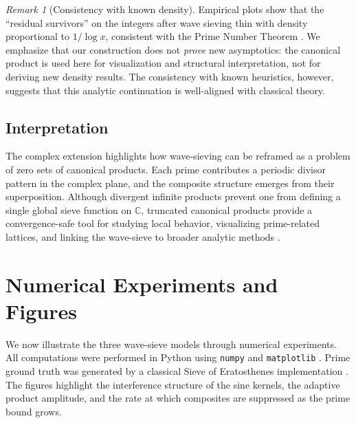 \documentclass[12pt]{article}
\theoremstyle{definition}
\theoremstyle{remark}
\newtheorem{remark}{Remark}
\newcommand{\C}{\mathbb{C}}
\begin{document}
\begin{remark}[Consistency with known density]
Empirical plots show that the ``residual survivors'' on the integers after wave sieving thin 
with density proportional to \(1/\log x\), consistent with the Prime Number Theorem 
\citep{hardy2008introduction,tenenbaum2015analytic}. 
We emphasize that our construction does not \emph{prove} new asymptotics: 
the canonical product is used here for visualization and structural interpretation, 
not for deriving new density results. 
The consistency with known heuristics, however, suggests that this analytic continuation 
is well-aligned with classical theory.
\end{remark}

\subsection{Interpretation}

The complex extension highlights how wave-sieving can be reframed as a problem of zero sets of canonical products. 
Each prime contributes a periodic divisor pattern in the complex plane, 
and the composite structure emerges from their superposition. 
Although divergent infinite products prevent one from defining a single global sieve function on \(\C\), 
truncated canonical products provide a convergence-safe tool for studying local behavior, 
visualizing prime-related lattices, and linking the wave-sieve to broader analytic methods 
\citep{remmert1998classical,stein2003complex}.

\section{Numerical Experiments and Figures}

We now illustrate the three wave-sieve models through numerical experiments. 
All computations were performed in Python using \texttt{numpy} and \texttt{matplotlib} 
\citep{harris2020array,hunter2007matplotlib}. 
Prime ground truth was generated by a classical Sieve of Eratosthenes implementation 
\citep{crandall2006prime,hardy2008introduction}. 
The figures highlight the interference structure of the sine kernels, 
the adaptive product amplitude, 
and the rate at which composites are suppressed as the prime bound grows.
\end{document}
